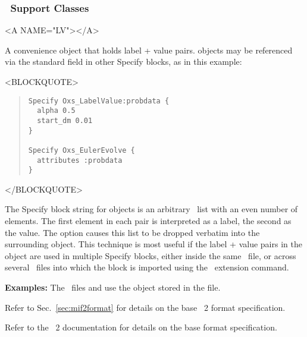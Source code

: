 \subsubsection{\MIF\ Support Classes}
\begin{rawhtml}<A NAME="LV"></A>\end{rawhtml}%
\begin{description}
%
\item[Oxs\_LabelValue:]
   A convenience object that holds label + value
   pairs.   objects may be referenced via the
   standard  field in other Specify blocks, as in
   this example:
\begin{rawhtml}<BLOCKQUOTE>\end{rawhtml}
\begin{quote}
\begin{verbatim}
Specify Oxs_LabelValue:probdata {
  alpha 0.5
  start_dm 0.01
}

Specify Oxs_EulerEvolve {
  attributes :probdata
}
\end{verbatim}
\end{quote}
\begin{rawhtml}</BLOCKQUOTE>\end{rawhtml}
   The Specify block string for  objects is an
   arbitrary \Tcl\ list with an even number of elements.  The first
   element in each pair is interpreted as a label, the second as the
   value.  The  option causes this list to be dropped
   verbatim into the surrounding object.  This technique is most useful
   if the label + value pairs in the  object are
   used in multiple Specify blocks, either inside the same \MIF\
   file, or across several \MIF\ files into which the
    block is imported using the  \MIF\
   extension command.

\textbf{Examples:} The \MIF\ files  and
    use the  object
   stored in the \fn{sample-attributes.tcl} file.

\end{description}

Refer to Sec.~\ref{sec:mif2format} for details on the base \MIF~2
format specification.
\begin{htmlonly}
Refer to the \MIF~2 documentation for details on the base format
specification.
\end{htmlonly}
